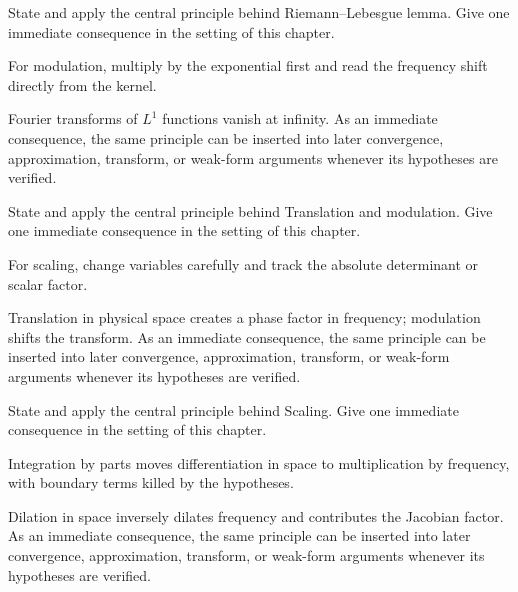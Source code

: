 \begin{exercise}\label{exr:iii11-03}
State and apply the central principle behind Riemann--Lebesgue lemma. Give one immediate consequence in the setting of this chapter.
\end{exercise}
\begin{hint}
For modulation, multiply by the exponential first and read the frequency shift directly from the kernel.
\end{hint}
\begin{solution}
Fourier transforms of $L^1$ functions vanish at infinity. As an immediate consequence, the same principle can be inserted into later convergence, approximation, transform, or weak-form arguments whenever its hypotheses are verified.
\end{solution}

\begin{exercise}\label{exr:iii11-04}
State and apply the central principle behind Translation and modulation. Give one immediate consequence in the setting of this chapter.
\end{exercise}
\begin{hint}
For scaling, change variables carefully and track the absolute determinant or scalar factor.
\end{hint}
\begin{solution}
Translation in physical space creates a phase factor in frequency; modulation shifts the transform. As an immediate consequence, the same principle can be inserted into later convergence, approximation, transform, or weak-form arguments whenever its hypotheses are verified.
\end{solution}

\begin{exercise}\label{exr:iii11-05}
State and apply the central principle behind Scaling. Give one immediate consequence in the setting of this chapter.
\end{exercise}
\begin{hint}
Integration by parts moves differentiation in space to multiplication by frequency, with boundary terms killed by the hypotheses.
\end{hint}
\begin{solution}
Dilation in space inversely dilates frequency and contributes the Jacobian factor. As an immediate consequence, the same principle can be inserted into later convergence, approximation, transform, or weak-form arguments whenever its hypotheses are verified.
\end{solution}

